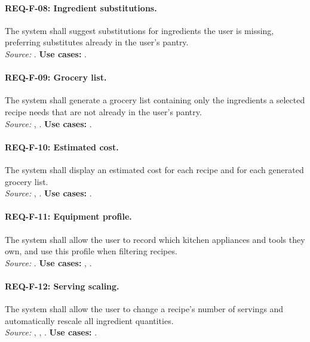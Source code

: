 \paragraph{REQ-F-08: Ingredient substitutions.}
 The system shall suggest substitutions for ingredients the user is missing, preferring substitutes already in the user's pantry.\\
\textit{Source:} . \textbf{Use cases:} .

\paragraph{REQ-F-09: Grocery list.}
 The system shall generate a grocery list containing only the ingredients a selected recipe needs that are not already in the user's pantry.\\
\textit{Source:} , . \textbf{Use cases:} .

\paragraph{REQ-F-10: Estimated cost.}
 The system shall display an estimated cost for each recipe and for each generated grocery list.\\
\textit{Source:} , . \textbf{Use cases:} .

\paragraph{REQ-F-11: Equipment profile.}
 The system shall allow the user to record which kitchen appliances and tools they own, and use this profile when filtering recipes.\\
\textit{Source:} . \textbf{Use cases:} , .

\paragraph{REQ-F-12: Serving scaling.}
 The system shall allow the user to change a recipe's number of servings and automatically rescale all ingredient quantities.\\
\textit{Source:} , , . \textbf{Use cases:} .


